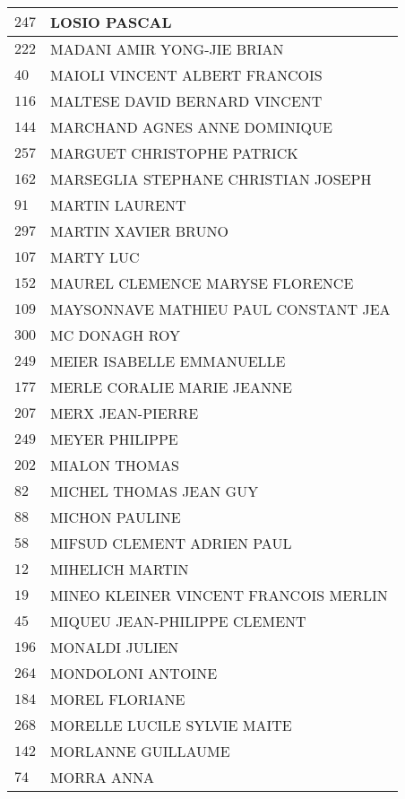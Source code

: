 \begin{xltabular}{\linewidth}{|l|X|}
    \hline
    $247$ & LOSIO PASCAL \\
    \hline
    $222$ & MADANI AMIR YONG-JIE BRIAN \\
    \hline
    $40$ & MAIOLI VINCENT ALBERT FRANCOIS \\
    \hline
    $116$ & MALTESE DAVID BERNARD VINCENT \\
    \hline
    $144$ & MARCHAND AGNES ANNE DOMINIQUE \\
    \hline
    $257$ & MARGUET CHRISTOPHE PATRICK \\
    \hline
    $162$ & MARSEGLIA STEPHANE CHRISTIAN JOSEPH \\
    \hline
    $91$ & MARTIN LAURENT \\
    \hline
    $297$ & MARTIN XAVIER BRUNO \\
    \hline
    $107$ & MARTY LUC \\
    \hline
    $152$ & MAUREL CLEMENCE MARYSE FLORENCE \\
    \hline
    $109$ & MAYSONNAVE MATHIEU PAUL CONSTANT JEA \\
    \hline
    $300$ & MC DONAGH ROY \\
    \hline
    $249$ & MEIER ISABELLE EMMANUELLE \\
    \hline
    $177$ & MERLE CORALIE MARIE JEANNE \\
    \hline
    $207$ & MERX JEAN-PIERRE \\
    \hline
    $249$ & MEYER PHILIPPE \\
    \hline
    $202$ & MIALON THOMAS \\
    \hline
    $82$ & MICHEL THOMAS JEAN GUY \\
    \hline
    $88$ & MICHON PAULINE \\
    \hline
    $58$ & MIFSUD CLEMENT ADRIEN PAUL \\
    \hline
    $12$ & MIHELICH MARTIN \\
    \hline
    $19$ & MINEO KLEINER VINCENT FRANCOIS MERLIN \\
    \hline
    $45$ & MIQUEU JEAN-PHILIPPE CLEMENT \\
    \hline
    $196$ & MONALDI JULIEN \\
    \hline
    $264$ & MONDOLONI ANTOINE \\
    \hline
    $184$ & MOREL FLORIANE \\
    \hline
    $268$ & MORELLE LUCILE SYLVIE MAITE \\
    \hline
    $142$ & MORLANNE GUILLAUME \\
    \hline
    $74$ & MORRA ANNA \\

\end{xltabular}
